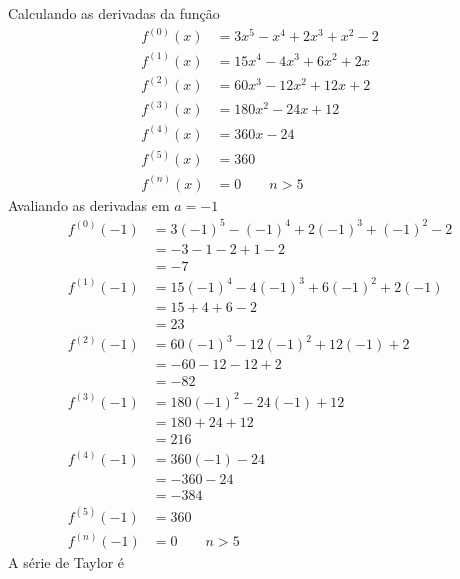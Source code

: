 \documentclass[a4paper,12pt,fleqn]{article}
\begin{document}
\begin{answer}
  Calculando as derivadas da função
  \begin{align*}
    f^{(0)}(x) & = 3x^5 - x^4 + 2x^3 + x^2 - 2 \\
    f^{(1)}(x) & = 15x^4 - 4x^3 + 6x^2 + 2x  \\
    f^{(2)}(x) & = 60x^3 - 12x^2 + 12x + 2 \\
    f^{(3)}(x) & = 180x^2 - 24x + 12  \\
    f^{(4)}(x) & = 360x - 24  \\
    f^{(5)}(x) & = 360  \\
    f^{(n)}(x) & = 0 \qquad n>5
  \end{align*}
  Avaliando as derivadas em \(a=-1\)
  \begin{align*}
    f^{(0)}(-1) & = 3(-1)^5 - (-1)^4 + 2(-1)^3 + (-1)^2 - 2 \\
                & = -3 - 1 - 2 + 1 - 2                      \\
                & = -7                                      \\
    f^{(1)}(-1) & = 15(-1)^4 - 4(-1)^3 + 6(-1)^2 + 2(-1)    \\
                & = 15 + 4 + 6 - 2                          \\
                & = 23                                      \\
    f^{(2)}(-1) & = 60(-1)^3 - 12(-1)^2 + 12(-1) + 2        \\
                & = -60 - 12 - 12 + 2                       \\
                & = -82                                     \\
    f^{(3)}(-1) & = 180(-1)^2 - 24(-1) + 12                 \\
                & = 180 + 24 + 12                           \\
                & = 216                                     \\
    f^{(4)}(-1) & = 360(-1) - 24                            \\
                & = -360 - 24                               \\
                & = -384                                    \\
    f^{(5)}(-1) & = 360                                     \\
    f^{(n)}(-1) & = 0 \qquad n>5
  \end{align*}
  A série de Taylor é
  \begin{align*}

\end{align*}
\end{answer}
\end{document}
